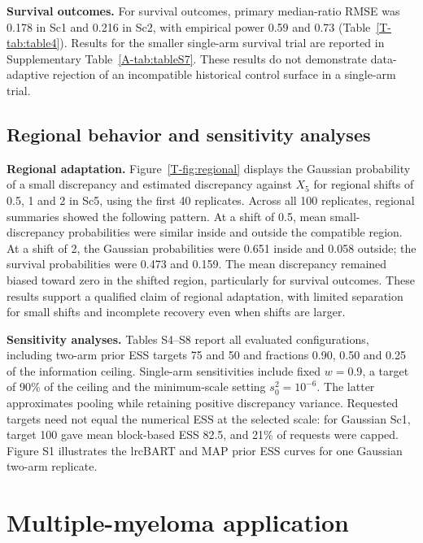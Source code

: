 \documentclass[11pt]{article}
\begin{document}
\noindent\textbf{Survival outcomes.}
For survival outcomes, primary \lrc{} median-ratio RMSE was 0.178 in Sc1 and 0.216 in Sc2, with empirical power 0.59 and 0.73 (Table~\ref{T-tab:table4}). Results for the smaller single-arm survival trial are reported in Supplementary Table~\ref{A-tab:tableS7}. These results do not demonstrate data-adaptive rejection of an incompatible historical control surface in a single-arm trial.

\subsection{Regional behavior and sensitivity analyses}
\noindent\textbf{Regional adaptation.}
Figure~\ref{T-fig:regional} displays the Gaussian probability of a small discrepancy and estimated discrepancy against $X_5$ for regional shifts of 0.5, 1 and 2 in Sc5, using the first 40 replicates. Across all 100 replicates, regional summaries showed the following pattern. At a shift of 0.5, mean small-discrepancy probabilities were similar inside and outside the compatible region. At a shift of 2, the Gaussian probabilities were 0.651 inside and 0.058 outside; the survival probabilities were 0.473 and 0.159. The mean discrepancy remained biased toward zero in the shifted region, particularly for survival outcomes. These results support a qualified claim of regional adaptation, with limited separation for small shifts and incomplete recovery even when shifts are larger.

\noindent\textbf{Sensitivity analyses.}
Tables S4--S8 report all evaluated configurations, including two-arm prior ESS targets 75 and 50 and fractions 0.90, 0.50 and 0.25 of the information ceiling. Single-arm sensitivities include fixed $w=0.9$, a target of 90\% of the ceiling and the minimum-scale setting $s_0^2=10^{-6}$. The latter approximates pooling while retaining positive discrepancy variance. Requested targets need not equal the numerical ESS at the selected scale: for Gaussian Sc1, target 100 gave mean block-based ESS 82.5, and 21\% of requests were capped. Figure S1 illustrates the lrcBART and MAP prior ESS curves for one Gaussian two-arm replicate.

\section{Multiple-myeloma application}
\end{document}

